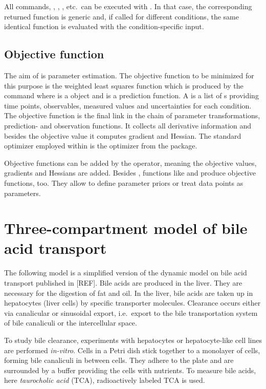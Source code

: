 \documentclass[article]{jss}
\begin{document}
All commands, , , , etc.~can be executed with . In that case, the corresponding returned function is generic and, if called for different conditions, the same identical function is evaluated with the condition-specific input. 

\subsection{Objective function}

The aim of  is parameter estimation. The objective function to be minimized for this purpose is the weighted least squares function which is produced by the command  where  is a  object and  is a prediction function. A  is a list of s providing time points, observables, measured values and uncertainties for each condition. The objective function is the final link in the chain of parameter transformations, prediction- and observation functions. It collects all derivative information and besides the objective value it computes gradient and Hessian. The standard optimizer employed within  is the  optimizer from the  package. 

Objective functions can be added by the  operator, meaning the objective values, gradients and Hessians are added. Besides , functions like  and  produce objective functions, too. They allow to define parameter priors or treat data points as parameters.


\section{Three-compartment model of bile acid transport}

The following model is a simplified version of the dynamic model on bile acid transport published in [REF]. Bile acids are produced in the liver. They are necessary for the digestion of fat and oil. In the liver, bile acids are taken up in hepatocytes (liver cells) by specific transporter molecules. Clearance occurs either via canalicular or sinusoidal export, i.e.~export to the bile transportation system of bile canaliculi or the intercellular space.

To study bile clearance, experiments with hepatocytes or hepatocyte-like cell lines are performed \textit{in-vitro}. Cells in a Petri dish stick together to a monolayer of cells, forming bile canaliculi in between cells. They adhere to the plate and are surrounded by a buffer providing the cells with nutrients. To measure bile acids, here \textit{taurocholic acid} (TCA), radioactively labeled TCA is used.
\end{document}
